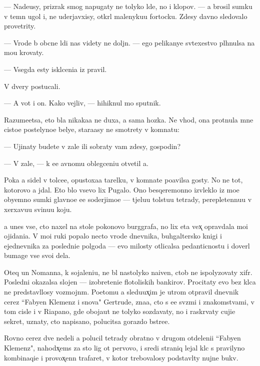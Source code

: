 \documentclass[10pt]{book}
\begin{document}
— Nade{\y}usy, prizrak smog napugaty ne tolyko l{\iu}de{\y}, no i klopov. — {\Y}a brosil sumku v temn{\yi}{\y} ugol i, ne uderjavxisy, otkr{\yi}l malenyku{\y}u fortocku. Zdesy davno sledovalo provetrity.

— Vrode b{\yi} ob{\yi}cn{\yi}{\y}e l{\iu}di nas videty ne doljn{\yi}. — {\Y}ego pelikanye sv{\ia}te{\y}xestvo pl{\iu}hnulsa na mo{\y}u krovaty.

— Vsegda {\y}esty iskl{\iu}ceni{\y}a iz pravil.

V dvery postucali.

— A vot i on. Kako{\y} vejliv{\yi}{\y}, — hihiknul mo{\y} sputnik.

Razume{\y}etsa, eto b{\yi}la nikaka{\y}a ne duxa, a sama hoz{\ia}{\y}ka. Ne vhod{\ia}, ona prot{\ia}nula mne cisto{\y}e postelyno{\y}e belye, stara{\y}asy ne smotrety v komnatu:

— Ujinaty budete v zale ili sobraty vam zdesy, gospodin?

— V zale, — k {\y}e{\y}e {\y}avnomu oblegceni{\y}u otvetil {\y}a.

Poka {\y}a sidel v tolce{\y}e, opustoxa{\y}a tarelku, v komnate po{\y}avilsa gosty. No ne tot, kotorovo {\y}a jdal. Eto b{\yi}lo vsevo lix Pugalo. Ono besqeremonno izvleklo iz mo{\y}e{\y} obyemno{\y} sumki glavno{\y}e {\y}e{\y}e soderjimo{\y}e — t{\ia}jelu{\y}u tolstu{\y}u tetrady, perepletennu{\y}u v xerxavu{\y}u svinu{\y}u koju.

{\Y}a unes vse, cto naxel na stole poko{\y}novo burggrafa, no lix eta vex̨ opravdala mo{\y}i ojidani{\y}a. V mo{\y}i ruki popalo necto vrode dnevnika, buhgaltersko{\y} knigi i {\y}ejednevnika za posledni{\y}e polgoda — {\y}evo milosty otlicalsa pedanticnost{\y}u i dover{\ia}l bumage vse svo{\y}i dela.

Oteq un Nomanna, k sojaleni{\y}u, ne b{\yi}l nastolyko na{\y}iven, ctob{\yi} ne ispolyzovaty xifr. Posledni{\y} okazalsa slojen — izobreteni{\y}e flotoli{\y}skih bankirov. Procitaty {\y}evo bez kl{\iu}ca ne predstavl{\ia}losy vozmojn{\yi}m. Poetomu {\y}a sledu{\y}ux̨im je utrom otpravil dnevnik cerez ``Fabyen Klemenz i s{\yi}nov{\y}a" Gertrude, zna{\y}a, cto s {\y}e{\y}e sv{\ia}z{\ia}mi i znakomstvami, v tom cisle i v Riapano, gde oboja{\y}ut ne tolyko sozdavaty, no i raskr{\yi}vaty cuji{\y}e sekret{\yi}, uznaty, cto napisano, polucitsa gorazdo b{\yi}stre{\y}e.

Rovno cerez dve nedeli {\y}a polucil tetrady obratno v drugom otdeleni{\y}i ``Fabyen Klemenz", nahod{\ia}x̨ems{\ia} za sto lig ot pervovo, i sredi straniq lejal kl{\iu}c s pravilyno{\y} kombinaqi{\y}e{\y} i provox̨enn{\yi}{\y} trafaret, v kotor{\yi}{\y} trebovalosy podstavl{\ia}ty nujn{\yi}{\y}e bukv{\yi}.
\end{document}
